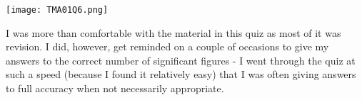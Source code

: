 \documentclass[a4paper,12pt]{article}
\numberwithin{equation}{section}
\begin{document}
\newpage

\begin{question}

\qpart
\begin{center}
\texttt{[image: TMA01Q6.png]}
\end{center}

\qpart
I was more than comfortable with the material in this quiz as most of it was revision. I did, however, get reminded on a couple of occasions to give my answers to the correct number of significant figures - I went through the quiz at such a speed (because I found it relatively easy) that I was often giving answers to full accuracy when not necessarily appropriate.

\end{question}
\end{document}
